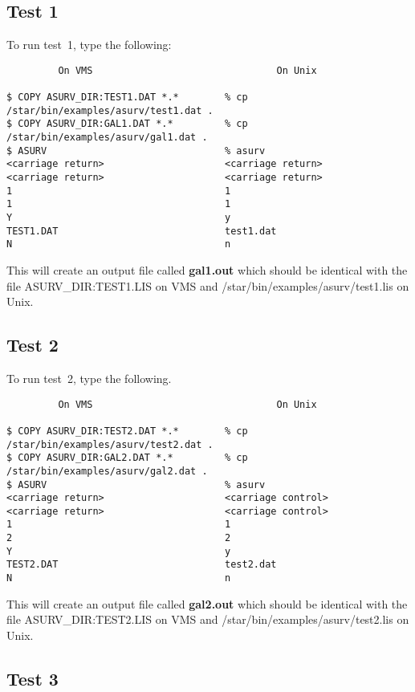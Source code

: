 \subsection{Test 1}

To run test~1, type the following:

\begin{verbatim}
         On VMS                                On Unix

$ COPY ASURV_DIR:TEST1.DAT *.*        % cp /star/bin/examples/asurv/test1.dat .
$ COPY ASURV_DIR:GAL1.DAT *.*         % cp /star/bin/examples/asurv/gal1.dat .
$ ASURV                               % asurv
<carriage return>                     <carriage return>
<carriage return>                     <carriage return>
1                                     1
1                                     1
Y                                     y
TEST1.DAT                             test1.dat
N                                     n
\end{verbatim}

This will create an output file called {\bf gal1.out} which should be identical
with the file ASURV\-\_DIR:\-TEST1.LIS on VMS and
/star\-/bin\-/examples\-/asurv\-/test1.lis on Unix.

\subsection{Test 2}

To run test~2, type the following.

\begin{verbatim}
         On VMS                                On Unix

$ COPY ASURV_DIR:TEST2.DAT *.*        % cp /star/bin/examples/asurv/test2.dat .
$ COPY ASURV_DIR:GAL2.DAT *.*         % cp /star/bin/examples/asurv/gal2.dat .
$ ASURV                               % asurv
<carriage return>                     <carriage control>
<carriage return>                     <carriage control>
1                                     1
2                                     2
Y                                     y
TEST2.DAT                             test2.dat
N                                     n
\end{verbatim}

This will create an output file called {\bf gal2.out} which should be identical
with the file ASURV\-\_DIR:\-TEST2.LIS on VMS and
/star\-/bin\-/examples\-/asurv\-/test2.lis on Unix.

\subsection{Test 3}

